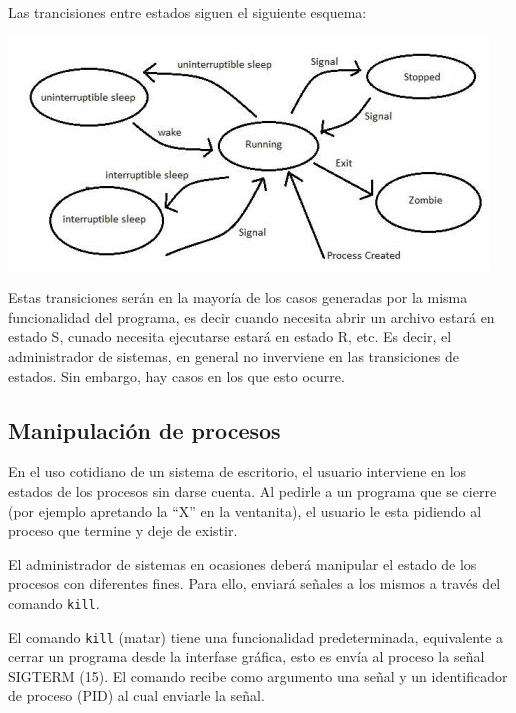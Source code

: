 \documentclass[12pt]{article}
\begin{document}
Las trancisiones entre estados siguen el siguiente esquema: 

\begin{center}
\includegraphics{process-states-s.jpg}
\end{center}
 
Estas transiciones serán en la mayoría de los casos generadas por la misma
funcionalidad del programa, es decir cuando necesita abrir un archivo
estará en estado S, cunado necesita ejecutarse estará en estado R, etc. 
Es decir, el administrador de sistemas, en general no inverviene en las
transiciones de estados. Sin embargo, hay casos en los que esto ocurre. 

\subsection*{Manipulación de procesos}

En el uso cotidiano de un sistema de escritorio, el usuario interviene 
en los estados de los procesos sin darse cuenta. Al pedirle a un programa
que se cierre (por ejemplo apretando la ``X'' en la ventanita), el usuario
le esta pidiendo al proceso que termine y deje de existir. 

El administrador de sistemas en ocasiones deberá manipular el estado de 
los procesos con diferentes fines. Para ello, enviará señales a los 
mismos a través del comando \texttt{kill}. 


El comando \texttt{kill} (matar) tiene una funcionalidad predeterminada, 
equivalente a cerrar un programa desde la interfase gráfica, esto es envía
al proceso la señal SIGTERM (15). El comando 
recibe como argumento una señal y un identificador de proceso (PID) al 
cual enviarle la señal. 
\end{document}
